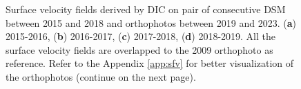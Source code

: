 \begin{figure}[!p]
{    }
    \caption{Surface velocity fields derived by DIC on pair of consecutive DSM between 2015 and 2018 and 
    orthophotos between 2019 and 2023. (\textbf{a}) 2015-2016, (\textbf{b}) 2016-2017, (\textbf{c}) 2017-2018, (\textbf{d}) 2018-2019.
    All the surface velocity fields are overlapped to the 2009 orthophoto \citep{Degaetani2021} as reference. Refer to the Appendix \ref{app:sfv} for better visualization of the orthophotos  (continue on the next page).}
    \label{fig:3:dic_vel}
\end{figure}

\begin{figure}[!p]\ContinuedFloat
    \centering
\end{figure}
